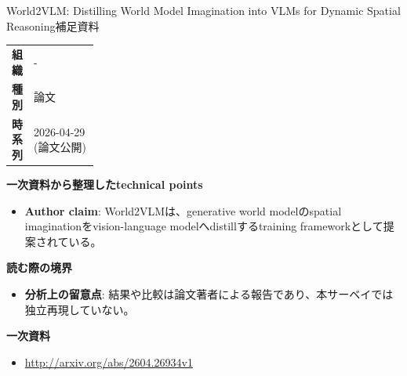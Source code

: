 \begin{technicalnote}{World2VLM: Distilling World Model Imagination into VLMs for Dynamic Spatial Reasoning}{補足資料}
\begingroup
\begin{tabularx}{\linewidth}{@{}>{\bfseries}p{0.22\linewidth}X@{}}
組織 & - \\
種別 & 論文 \\
時系列 & 2026-04-29 (論文公開) \\
\end{tabularx}
\smallskip
{\bfseries 一次資料から整理したtechnical points}
\begin{itemize}[leftmargin=1.5em,itemsep=0.35em]
\item \textbf{Author claim}: World2VLMは、generative world modelのspatial imaginationをvision-language modelへdistillするtraining frameworkとして提案されている。
\end{itemize}
\begin{minipage}{\linewidth}
{\bfseries 読む際の境界}
\begin{itemize}[leftmargin=1.5em,itemsep=0.35em]
\item \textbf{分析上の留意点}: 結果や比較は論文著者による報告であり、本サーベイでは独立再現していない。
\end{itemize}
\begin{samepage}
{\bfseries 一次資料}
\begingroup\sloppy
\begin{itemize}[leftmargin=1.5em,itemsep=0.25em]
\item {\scriptsize\url{http://arxiv.org/abs/2604.26934v1}}
\end{itemize}
\endgroup
\end{samepage}
\end{minipage}
\endgroup
\end{technicalnote}
\medskip
